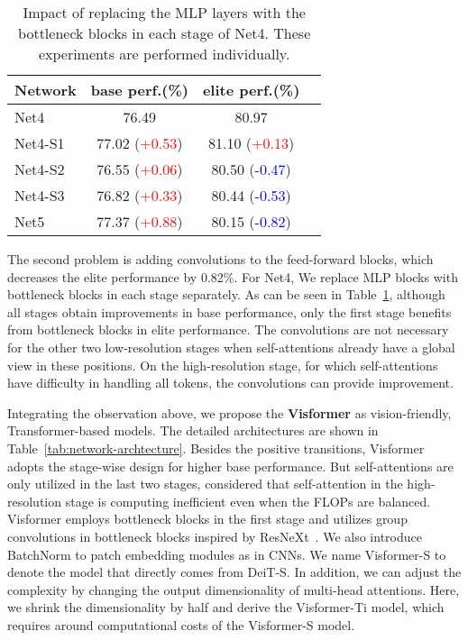 \documentclass[10pt,twocolumn,letterpaper]{article}
\begin{document}
\begin{table}
\begin{center}
\begin{tabular}{|l|c|c|c|}
\hline
Network & base perf.(\%)& elite perf.(\%)\\
\hline\hline
Net4 & 76.49  & 80.97 \\
\hline
Net4-S1  & 77.02 (\textcolor{red}{+0.53}) & 81.10 (\textcolor{red}{+0.13}) \\
Net4-S2  & 76.55 (\textcolor{red}{+0.06}) & 80.50 (\textcolor{blue}{-0.47})\\
Net4-S3  & 76.82 (\textcolor{red}{+0.33}) & 80.44 (\textcolor{blue}{-0.53})\\
\hline
Net5 & 77.37 (\textcolor{red}{+0.88}) & 80.15 (\textcolor{blue}{-0.82})\\
\hline
\end{tabular}
\end{center}
\caption{Impact of replacing the MLP layers with the bottleneck blocks in each stage of Net4. These experiments are performed individually.}
\label{tab:convolution-ablation}
\end{table}



The second problem is adding  convolutions to the feed-forward blocks, which decreases the elite performance by 0.82\%. For Net4, We replace MLP blocks with bottleneck blocks in each stage separately. As can be seen in Table~\ref{tab:convolution-ablation}, although all stages obtain improvements in base performance, only the first stage benefits from bottleneck blocks in elite performance. The  convolutions are not necessary for the other two low-resolution stages when self-attentions already have a global view in these positions. On the high-resolution stage, for which self-attentions have difficulty in handling all tokens, the  convolutions can provide improvement.

Integrating the observation above, we propose the \textbf{Visformer} as vision-friendly, Transformer-based models. The detailed architectures are shown in Table~\ref{tab:network-archtecture}. Besides the positive transitions, Visformer adopts the stage-wise design for higher base performance. But self-attentions are only utilized in the last two stages, considered that self-attention in the high-resolution stage is computing inefficient even when the FLOPs are balanced. Visformer employs bottleneck blocks in the first stage and utilizes group  convolutions in bottleneck blocks inspired by ResNeXt~\cite{xie2016aggregated}. We also introduce BatchNorm to patch embedding modules as in CNNs. We name Visformer-S to denote the model that directly comes from DeiT-S. In addition, we can adjust the complexity by changing the output dimensionality of multi-head attentions. Here, we shrink the dimensionality by half and derive the Visformer-Ti model, which requires around  computational costs of the Visformer-S model.
\end{document}
